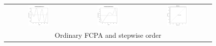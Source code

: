 \begin{figure}
\begin{center}
\begin{tabular}{ccc}
\includegraphics[width=0.33\textwidth]{Graphs/Fit3FunParam1.png} & \includegraphics[width=0.33\textwidth]{Graphs/Fit3FunParam2.png} & \includegraphics[width=0.33\textwidth]{Graphs/Fit3ROC.png} \\
\multicolumn{3}{c}{Ordinary FCPA and stepwise order}\\

\end{tabular}
\end{center}
\end{figure}
